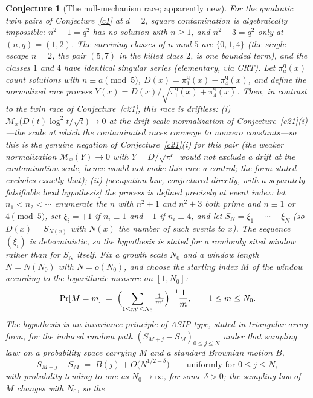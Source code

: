 \documentclass[11pt]{article}
\newtheorem{conjecture}{Conjecture}
\theoremstyle{definition}
\newcommand{\M}{\mathcal M}
\begin{document}
\setcounter{conjecture}{13}%
\begin{conjecture}[The null-mechanism race; apparently new]\label{c8}
For the quadratic twin pairs of Conjecture~\ref{c1} at $d=2$, square
contamination is \emph{algebraically impossible}: $n^2+1=q^2$ has no
solution with $n\ge1$, and $n^2+3=q^2$ only at $(n,q)=(1,2)$.  The surviving classes of $n$ mod $5$ are $\{0,1,4\}$ (the single escape $n=2$, the pair $(5,7)$ in the killed class $2$, is one bounded term), and the classes
$1$ and $4$ have identical singular series (elementary, via CRT).
Let $\pi^{\mathrm q}_a(x)$ count solutions with $n\equiv a\pmod5$,
$D(x)=\pi^{\mathrm q}_1(x)-\pi^{\mathrm q}_4(x)$, and define the
normalized race process
$Y(x)=D(x)\big/\sqrt{\pi^{\mathrm q}_1(x)+\pi^{\mathrm q}_4(x)}$.
Then, in contrast to the twin race of Conjecture~\ref{c21}, this race
is \emph{driftless}:
\emph{(i)} $\M_x\bigl(D(t)\log^2t/\sqrt t\bigr)\to0$ at the
\emph{drift-scale} normalization of Conjecture~\ref{c21}(i)---the
scale at which the contaminated races converge to nonzero
constants---so this is the genuine negation of
Conjecture~\ref{c21}(i) for this pair (the weaker normalization
$\M_x(Y)\to0$ with $Y=D/\sqrt{\pi^{\mathrm q}}$ would not exclude a
drift at the contamination scale, hence would not make this race a
control; the form stated excludes exactly that);
\emph{(ii)} [occupation law, conjectured directly, with a separately
falsifiable local hypothesis] the process is defined precisely at
event index: let
$n_1<n_2<\cdots$ enumerate the $n$ with $n^2+1$ and $n^2+3$ both
prime and $n\equiv1$ or $4\pmod5$, set $\xi_i=+1$ if
$n_i\equiv1$ and $-1$ if $n_i\equiv4$, and let
$S_N=\xi_1+\cdots+\xi_N$ (so $D(x)=S_{N(x)}$ with $N(x)$ the number
of such events to $x$).  The sequence $(\xi_i)$ is deterministic, so the hypothesis is
stated for a randomly sited window rather than for $S_N$ itself.
Fix a growth scale $N_0$ and a window length $N=N(N_0)$ with
$N=o(N_0)$, and choose the starting index $M$ of the window
according to the logarithmic measure on $[1,N_0]$:
\[
\Pr[M=m]\;=\;\Bigl(\sum_{1\le m'\le N_0}\tfrac1{m'}\Bigr)^{-1}
\frac1m,\qquad 1\le m\le N_0 .
\]
The hypothesis is an invariance principle of ASIP type, stated in
triangular-array form, for the induced random path $(S_{M+j}-S_M)_{0\le j\le N}$ under that
sampling law: on a probability space carrying $M$ and a standard
Brownian motion $B$,
\[
S_{M+j}-S_M\;=\;B(j)+O\bigl(N^{1/2-\delta}\bigr)
\qquad\text{uniformly for }0\le j\le N,
\]
with probability tending to one as $N_0\to\infty$, for some
$\delta>0$; the sampling law of $M$ changes with $N_0$, so the

\end{conjecture}
\end{document}
